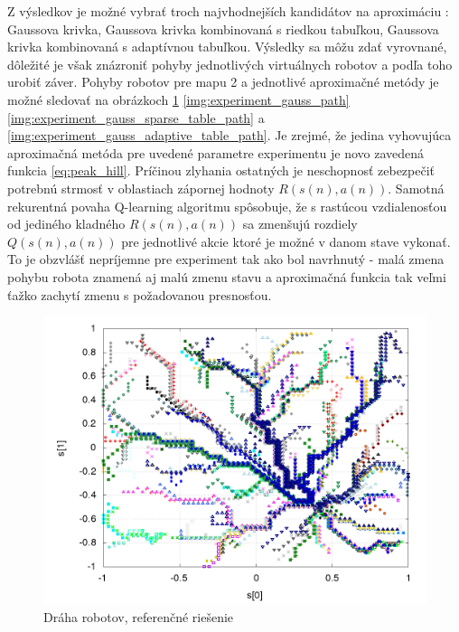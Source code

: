 Z výsledkov je možné vybrať troch najvhodnejších kandidátov na aproximáciu :
Gaussova krivka, Gaussova krivka kombinovaná s riedkou tabuľkou,
Gaussova krivka kombinovaná s adaptívnou tabuľkou. Výsledky sa môžu zdať
vyrovnané, dôležité je však znázroniť pohyby jednotlivých virtuálnych robotov a
podľa toho urobiť záver. Pohyby robotov pre mapu 2 a jednotlivé aproximačné
metódy je možné sledovať na obrázkoch
\ref{img:experiment_ref_path}
\ref{img:experiment_gauss_path}
\ref{img:experiment_gauss_sparse_table_path}
a   \ref{img:experiment_gauss_adaptive_table_path}. Je zrejmé, že jedina vyhovujúca
aproximačná metóda pre uvedené parametre experimentu je novo zavedená funkcia \ref{eq:peak_hill}.
Príčinou zlyhania ostatných je neschopnosť zebezpečiť potrebnú strmosť v oblastiach
zápornej hodnoty $R(s(n), a(n))$. Samotná rekurentná povaha Q-learning algoritmu spôsobuje,
že s rastúcou vzdialenosťou od jediného kladného $R(s(n), a(n))$ sa zmenšujú rozdiely
$Q(s(n), a(n))$ pre jednotlivé akcie ktoré je možné v danom stave vykonať. To je obzvlášť nepríjemne
pre experiment tak ako bol navrhnutý - malá zmena pohybu robota znamená aj malú zmenu stavu
a aproximačná funkcia tak veľmi ťažko zachytí zmenu s požadovanou presnosťou.


  \begin{figure}[!htb]
  \centering
  \includegraphics[scale=.4]{../../results_q_learning/map_2/function_type_0/iterations_10/agents_path_surface.png}
  \caption{Dráha robotov, referenčné riešenie}
  \label{img:experiment_ref_path}
  \end{figure}

